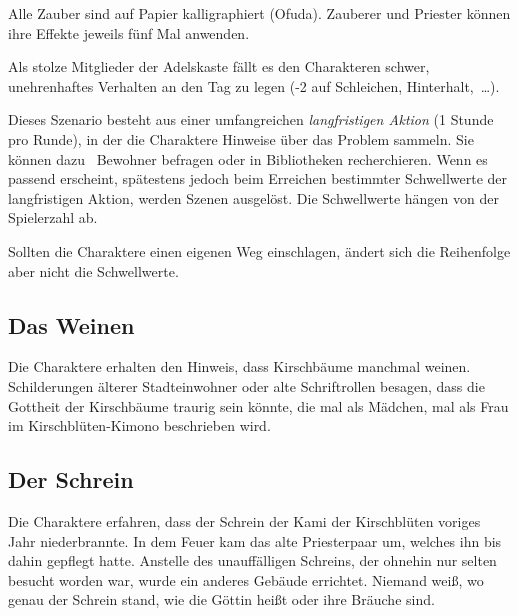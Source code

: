 {		\noindent
		Alle Zauber sind auf Papier kalligraphiert (Ofuda). Zauberer und Priester können ihre Effekte jeweils fünf Mal anwenden.

		Als stolze Mitglieder der Adelskaste fällt es den Charakteren schwer, unehrenhaftes Verhalten an den Tag zu legen (-2 auf Schleichen, Hinterhalt,~\ldots).


		\noindent
		Dieses Szenario besteht aus einer umfangreichen \emph{langfristigen Aktion} (1 Stunde pro Runde), in der die Charaktere Hinweise über das Problem sammeln. Sie können dazu \zB\ Bewohner befragen oder in Bibliotheken recherchieren. Wenn es passend erscheint, spätestens jedoch beim Erreichen bestimmter Schwellwerte der langfristigen Aktion, werden Szenen ausgelöst. Die Schwellwerte hängen von der Spielerzahl ab.


		\noindent
		Sollten die Charaktere einen eigenen Weg einschlagen, ändert sich die Reihenfolge aber nicht die Schwellwerte.

		\subsection{Das Weinen}

			Die Charaktere erhalten den Hinweis, dass Kirschbäume manchmal weinen. Schilderungen älterer Stadteinwohner oder alte Schriftrollen besagen, dass die Gottheit der Kirschbäume traurig sein könnte, die mal als Mädchen, mal als Frau im Kirschblüten-Kimono beschrieben wird.

		\subsection{Der Schrein}

			Die Charaktere erfahren, dass der Schrein der Kami der Kirschblüten voriges Jahr niederbrannte. In dem Feuer kam das alte Priesterpaar um, welches ihn bis dahin gepflegt hatte. Anstelle des unauffälligen Schreins, der ohnehin nur selten besucht worden war, wurde ein anderes Gebäude errichtet. Niemand weiß, wo genau der Schrein stand,  wie die Göttin heißt oder ihre Bräuche sind.

}
